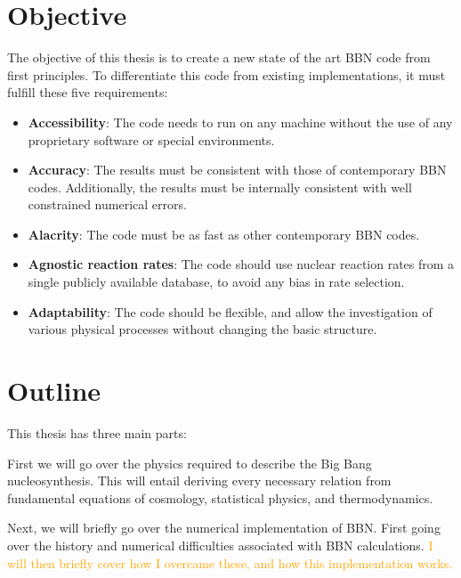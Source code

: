 \section{Objective}
The objective of this thesis is to create a new state of the art BBN code from first principles. To differentiate this code from existing implementations, it must fulfill these five requirements:

\begin{itemize}
    \item \textbf{Accessibility}: The code needs to run on any machine without the use of any proprietary software or special environments. %
    \item \textbf{Accuracy}: The results must be consistent with those of contemporary BBN codes. Additionally, the results must be internally consistent with well constrained numerical errors. 
    \item \textbf{Alacrity}: The code must be as fast as other contemporary BBN codes.
    \item \textbf{Agnostic reaction rates}: The code should use nuclear reaction rates from a single publicly available database, to avoid any bias in rate selection.
    \item \textbf{Adaptability}: The code should be flexible, and allow the investigation of various physical processes without changing the basic structure.
\end{itemize}

\section{Outline}

This thesis has three main parts:

\noindent First we will go over the physics required to describe the Big Bang nucleosynthesis. This will entail deriving every necessary relation from fundamental equations of cosmology, statistical physics, and thermodynamics. 

\noindent Next, we will briefly go over the numerical implementation of BBN. First going over the history and numerical difficulties associated with BBN calculations. \textcolor{orange}{I will then briefly cover how I overcame these, and how this implementation works.}

